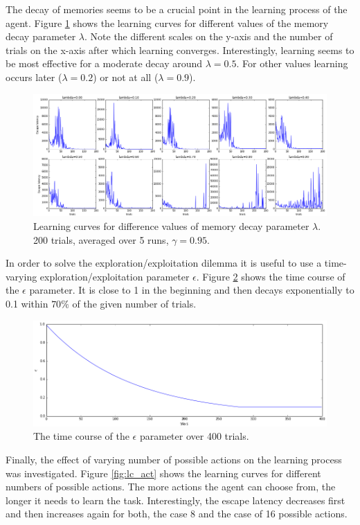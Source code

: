 The decay of memories seems to be a crucial point in the learning process of the agent. Figure \ref{fig:lc_lam} shows the learning curves for different values of the memory decay parameter $\lambda$. Note the different scales on the y-axis and the number of trials on the x-axis after which learning converges. Interestingly, learning seems to be most effective for a moderate decay around $\lambda=0.5$. For other values learning occurs later ($\lambda=0.2$) or not at all ($\lambda=0.9$). 

\begin{figure}[h]
\centering
\includegraphics[width=1\textwidth]{figures/learning_curve_lambda.png}
\caption{\label{fig:lc_lam} Learning curves for difference values of memory decay parameter $\lambda$. 200 trials, averaged over 5 runs, $\gamma=0.95$.}
\end{figure}

In order to solve the exploration/exploitation dilemma it is useful to use a time-varying exploration/exploitation parameter $\epsilon$. Figure \ref{fig:eps} shows the time course of the $\epsilon$ parameter. It is close to 1 in the beginning and then decays exponentially to 0.1 within $70\%$ of the given number of trials. 

\begin{figure}[h]
\centering
\includegraphics[width=.8\textwidth]{figures/epsilon_timecourse.png}
\caption{\label{fig:eps}The time course of the $\epsilon$ parameter over 400 trials.}
\end{figure}

Finally, the effect of varying number of possible actions on the learning process was investigated. Figure \ref{fig:lc_act} shows the learning curves for different numbers of possible actions. The more actions the agent can choose from, the longer it needs to learn the task. Interestingly, the escape latency decreases first and then increases again for both, the case 8 and the case of 16 possible actions. 

